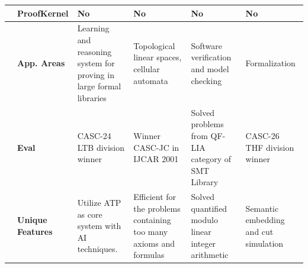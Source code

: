\begin{table}[ht]
{\begin{tabular}{|p{}|p{}|p{4.2cm}|p{4.2cm}|p{4.2cm}|p{4.2cm}|}
 & \textbf{ProofKernel} & No & No & No & No\\ \hline
\parbox[t]{2mm}{} & \textbf{App. Areas} & Learning and reasoning system for proving in large formal libraries & Topological linear spaces, cellular automata & Software verification and model checking & Formalization
\\
 & \textbf{Eval} & CASC-24 LTB division winner &  Winner CASC-JC in IJCAR 2001 & Solved problems from QF-LIA category of SMT Library & CASC-26 THF division winner \\
& \textbf{Unique Features} & Utilize ATP as core system with AI techniques. &
 Efficient for the problems containing too many axioms and formulas & Solved quantified modulo linear integer arithmetic & 
 Semantic embedding and cut simulation
 \\
\hline
\end{tabular}
}
\label{MaLARea and Muscadet}
\end{table}
